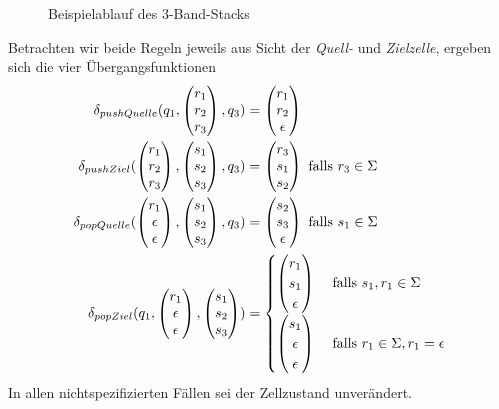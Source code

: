 \documentclass{article}
\begin{document}
\begin{figure}[h]
    \caption{Beispielablauf des 3-Band-Stacks}
\end{figure}
Betrachten wir beide Regeln jeweils aus Sicht der \emph{Quell-} und \emph{Zielzelle}, ergeben sich die vier Übergangsfunktionen
\begin{align*}
    \delta_{pushQuelle}(q_1,\begin{pmatrix}r_1\\r_2\\r_3\end{pmatrix},q_3) &= \begin{pmatrix}r_1\\r_2\\\epsilon\end{pmatrix} \\
    \delta_{pushZiel}(\begin{pmatrix}r_1\\r_2\\r_3\end{pmatrix},\begin{pmatrix}s_1\\s_2\\s_3\end{pmatrix},q_3) &= \begin{pmatrix}r_3\\s_1\\s_2\end{pmatrix} \text{ falls } r_3 \in \Sigma \\
    \delta_{popQuelle}(\begin{pmatrix}r_1\\\epsilon\\\epsilon\end{pmatrix},\begin{pmatrix}s_1\\s_2\\s_3\end{pmatrix},q_3) &= \begin{pmatrix}s_2\\s_3\\\epsilon\end{pmatrix} \text { falls } s_1 \in \Sigma \\
    \delta_{popZiel}(q_1,\begin{pmatrix}r_1\\\epsilon\\\epsilon\end{pmatrix},\begin{pmatrix}s_1\\s_2\\s_3\end{pmatrix}) &= \begin{cases}
        \begin{pmatrix}r_1\\s_1\\\epsilon\end{pmatrix} &\text { falls } s_1,r_1 \in \Sigma \\
        \begin{pmatrix}s_1\\\epsilon\\\epsilon\end{pmatrix} &\text { falls } r_1 \in \Sigma, r_1 = \epsilon
    \end{cases}
\end{align*}
In allen nichtspezifizierten Fällen sei der Zellzustand unverändert.
\end{document}

